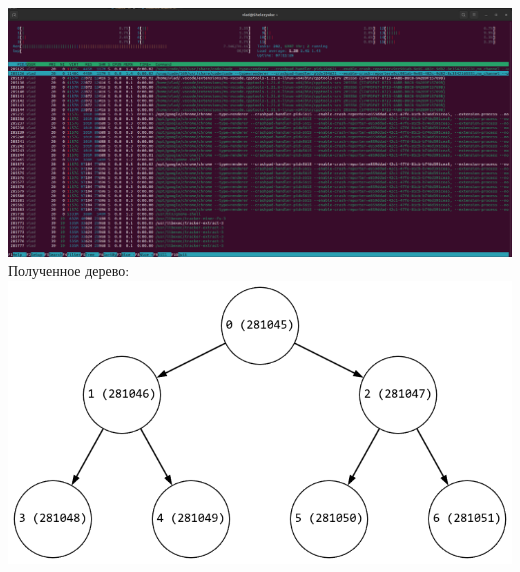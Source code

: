 \documentclass[a4paper,14pt]{extarticle}
\begin{document}
\includegraphics[width=140mm]{main_htop_after}\\
Полученное дерево:\\
\includegraphics[width=140mm]{main.png}\\
\end{document}
